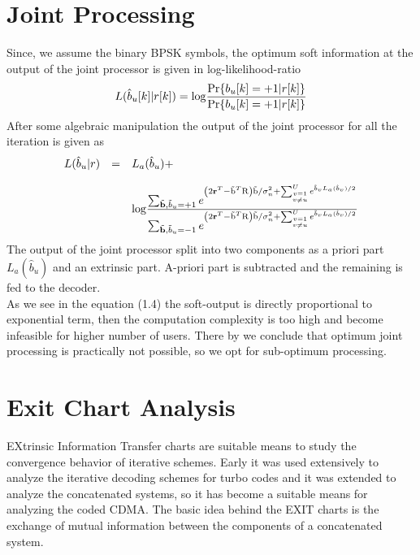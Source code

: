 \section{Joint Processing}
Since, we assume the binary BPSK symbols, the optimum soft information at the output of the joint processor is given in log-likelihood-ratio
\begin{equation}
L(\hat{b}_u[k]\vert r[k])=\mathrm{log}\frac{\hbox{$\mathrm{Pr}\{b_u[k]=+1\vert r[k]\}$}}{\hbox{$\mathrm{Pr}\{b_u[k]=+1\vert r[k]\}$}}
\end{equation}
After some algebraic manipulation the output of the joint processor for all the iteration is given as
\begin{eqnarray}
\begin{array}{lll}
L(\hat{b}_u\vert r)&=&L_a(\hat{b}_u)+ \\ \\
&&\mathrm{log}\frac{\hbox{$\sum_{\tilde{\mathrm{\mathbf{b}}},\tilde{b}_u=+1}e^{\left(2\mathrm{\mathbf{r}}^T-\tilde{\mathrm{b}}^T\mathrm{R}\right)\tilde{\mathrm{b}}/\sigma_n^2+\sum_{\stackrel{v=1}{v\neq u}}^U e^{\tilde{b}_vL_a(\hat{b}_v)/2}}$}}{\hbox{$\sum_{\tilde{\mathrm{\mathbf{b}}},\tilde{b}_u=-1}e^{\left(2\mathrm{\mathbf{r}}^T-\tilde{\mathrm{b}}^T\mathrm{R}\right)\tilde{\mathrm{b}}/\sigma_n^2+\sum_{\stackrel{v=1}{v\neq u}}^U e^{\tilde{b}_vL_a(\hat{b}_v)/2}}$}} 
\end{array}
\end{eqnarray}
The output of the joint processor split into two components as a priori part $L_a(\hat{b}_u)$ and an extrinsic part. A-priori part is subtracted and the remaining is fed to the decoder. \\ 

As we see in the equation (1.4) the soft-output is directly proportional to exponential term, then the computation complexity is too high and become infeasible for higher number of users. There by we conclude that optimum joint processing is practically not possible, so we opt for sub-optimum processing. \\

\section{Exit Chart Analysis}
EXtrinsic Information Transfer charts are suitable means to study the convergence behavior of iterative schemes. Early it was used extensively to analyze the iterative decoding schemes for turbo codes and it was extended to analyze the concatenated systems, so it has become a suitable means for analyzing the coded CDMA. The basic idea behind the EXIT charts is the exchange of mutual information between the components of a concatenated system. \\

